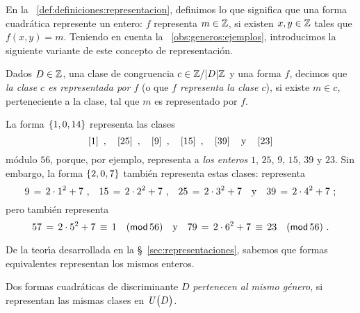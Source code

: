 En la ~\ref{def:definiciones:representacion}, definimos lo que
significa que una forma cuadr\'atica represente un entero: $f$ representa
$m\in\Enteros$, si existen $x,y\in\Enteros$ tales que $f(x,y)=m$.
Teniendo en cuenta la \obsname~\ref{obs:generos:ejemplos}, introducimos
la siguiente variante de este concepto de representaci\'on.

\begin{defGeneros}\label{def:generos:representacion:mod}
	Dados $D\in\Enteros$, una clase de congruencia
	$c\in\Enterosmod[|D|]$ y una forma $f$, decimos que
	\emph{la clase $c$ es representada por $f$} (o que \emph{$f$ %
	representa la clase $c$}), si existe $m\in c$, perteneciente a la
	clase, tal que $m$ es representado por $f$.
\end{defGeneros}

\begin{ejemGeneros}\label{ejem:generos:representacion:mod}
	La forma $\binaria{1,0,14}$ representa las clases
	\begin{displaymath}
		\clase 1\dispcomma\quad
		\clase{25}\dispcomma\quad
		\clase 9\dispcomma\quad
		\clase{15}\dispcomma\quad
		\clase{39}\dispand
		\clase{23}
	\end{displaymath}
	m\'odulo $56$, porque, por ejemplo, representa a \emph{los enteros}
	$1$, $25$, $9$, $15$, $39$ y $23$. Sin embargo, la forma
	$\binaria{2,0,7}$ tambi\'en representa estas clases:
	representa
	\begin{displaymath}
		9\,=\,2\cdot 1^2+7\dispcomma\quad
		15\,=\,2\cdot 2^2+7\dispcomma\quad
		25\,=\,2\cdot 3^2+7\dispand
		39\,=\,2\cdot 4^2+7
		\text{ ;}
	\end{displaymath}
	pero tambi\'en representa
	\begin{displaymath}
		57\,=\,2\cdot 5^2+7\,\equiv\,1\modulo[56]
		\dispand
		79\,=\,2\cdot 6^2+7\,\equiv\,23\modulo[56]
		\dispstop
	\end{displaymath}
\end{ejemGeneros}

De la teor\'{\i}a desarrollada en la \S~\ref{sec:representaciones}, sabemos
que formas equivalentes representan los mismos enteros.

\begin{defGeneros}\label{def:generos}
	Dos formas cuadr\'aticas %
	de discriminante $D$ \emph{pertenecen al mismo g\'enero},
	si representan las mismas clases en $\Unidadesmod[D]$.
\end{defGeneros}

